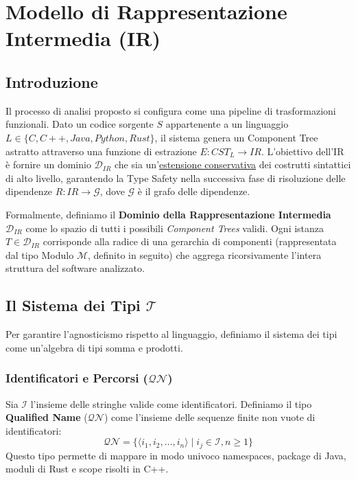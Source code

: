 \chapter{Modello di Rappresentazione Intermedia (IR)}
\section{Introduzione}
Il processo di analisi proposto si configura come una pipeline di
trasformazioni funzionali. Dato un codice sorgente $S$ appartenente a
un linguaggio $L \in \{C, C++, Java, Python, Rust\}$, il sistema
genera un Component Tree astratto attraverso una funzione di
estrazione $E: CST_L \to IR$. L'obiettivo dell'IR è fornire un
dominio $\mathcal{D}_{IR}$ che sia
un'\href{https://en.wikipedia.org/wiki/Conservative_extension}{estensione
conservativa} dei costrutti sintattici di alto livello, garantendo la
Type Safety nella successiva fase di risoluzione delle dipendenze $R:
IR \to \mathcal{G}$, dove $\mathcal{G}$ è il grafo delle dipendenze.

Formalmente, definiamo il \textbf{Dominio della Rappresentazione
Intermedia} $\mathcal{D}_{IR}$ come lo spazio di tutti i possibili
\textit{Component Trees} validi. Ogni istanza $T \in
\mathcal{D}_{IR}$ corrisponde alla radice di una gerarchia di
componenti (rappresentata dal tipo Modulo $\mathcal{M}$, definito in
seguito) che aggrega ricorsivamente l'intera struttura del software analizzato.

\section{Il Sistema dei Tipi $\mathcal{T}$}
Per garantire l'agnosticismo rispetto al linguaggio, definiamo il
sistema dei tipi come un'algebra di tipi somma e prodotti.

\subsection{Identificatori e Percorsi ($\mathcal{QN}$)}
Sia $\mathcal{I}$ l'insieme delle stringhe valide come
identificatori. Definiamo il tipo \textbf{Qualified Name}
($\mathcal{QN}$) come l'insieme delle sequenze finite non vuote di
identificatori:
$$\mathcal{QN} = \{ \langle i_1, i_2, \dots, i_n \rangle \mid i_j \in
\mathcal{I}, n \geq 1 \}$$
Questo tipo permette di mappare in modo univoco namespaces, package
di Java, moduli di Rust e scope risolti in C++.


